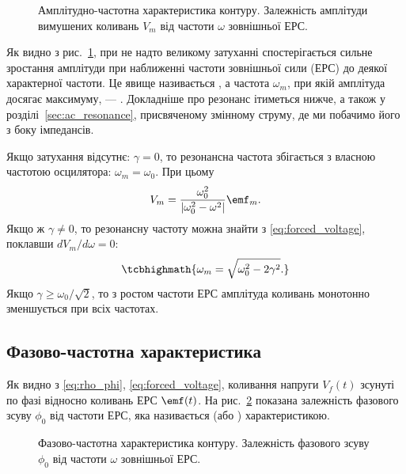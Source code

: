 \begin{figure}[h!]
	\centering
	\caption{Амплітудно-частотна характеристика контуру. Залежність амплітуди вимушених коливань $V_m$ від частоти $\omega$ зовнішньої ЕРС.}
	\label{tikz:amplitude_response}
\end{figure}

Як видно з рис.~\ref{tikz:amplitude_response}, при не надто великому затуханні спостерігається сильне зростання амплітуди при наближенні частоти
зовнішньої сили (ЕРС) до деякої характерної частоти. Це явище
називається , а частота $\omega_m$, при якій амплітуда досягає
максимуму, --- . Докладніше про резонанс ітиметься нижче, а також у розділі~\ref{sec:ac_resonance}, присвяченому змінному струму, де ми побачимо його з боку імпедансів.

Якщо затухання відсутнє: $\gamma = 0$, то резонансна частота збігається з власною частотою осцилятора: $\omega_m = \omega_0$. При цьому
\begin{equation}\label{eq:resonance_no_damping}
	V_m = \frac{\omega_0^2}{\left|\omega_0^2 - \omega^2\right|}\emf_m.
\end{equation}
Якщо ж $\gamma \neq 0$, то резонансну частоту можна знайти з \eqref{eq:forced_voltage}, поклавши
$dV_m/d\omega = 0$:
\begin{equation}\label{eq:resonance_frequency}
	\tcbhighmath{
		\omega_m = \sqrt{\omega_0^2 - 2\gamma^2}.
	}
\end{equation}
Якщо $\gamma \geqslant \omega_0/\sqrt{2}$, то з ростом частоти ЕРС амплітуда коливань монотонно зменшується при всіх частотах.

\subsection*{Фазово-частотна характеристика}

Як видно з \eqref{eq:rho_phi}, \eqref{eq:forced_voltage}, коливання напруги $V_f(t)$ зсунуті по фазі відносно коливань ЕРС $\emf(t)$. На рис.~\ref{tikz:phase_response} показана залежність фазового зсуву $\phi_0$ від частоти ЕРС, яка називається  (або ) характеристикою.

\begin{figure}[h!]
	\centering
	\caption{Фазово-частотна характеристика контуру. Залежність фазового зсуву $\phi_0$ від частоти $\omega$ зовнішньої ЕРС.}
	\label{tikz:phase_response}
\end{figure}

